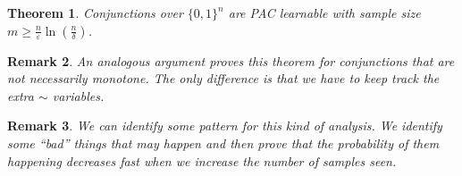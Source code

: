 \documentclass[12pt, letterpaper]{article}
\newcommand{\ve}{\varepsilon}
\newtheorem{theorem}{Theorem}[section]
\newtheorem{remark}[theorem]{Remark}
\theoremstyle{definition}
\theoremstyle{remark}
\begin{document}
\begin{theorem}
    Conjunctions over $\lbrace 0,1 \rbrace^n$ are PAC learnable with sample size  $m \geq \frac n\ve \ln\left(\frac n\delta\right)$.
\end{theorem}

\begin{remark}
    An analogous argument proves this theorem for conjunctions that are not necessarily monotone. The only difference is that we have to keep track the extra $\sim$ variables.
\end{remark}

\begin{remark}
    We can identify some pattern for this kind of analysis. We identify some ``bad'' things that may happen and then prove that the probability of them happening decreases fast when we increase the number of samples seen.
\end{remark}
\end{document}
